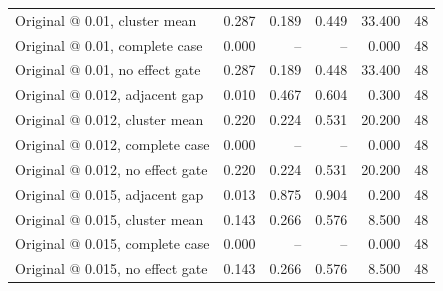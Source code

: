 \begin{table}[htbp]
{\begin{tabular}{lrrrrr}
Original @ 0.01, cluster mean & 0.287 & 0.189 & 0.449 & 33.400 & 48 \\
Original @ 0.01, complete case & 0.000 & -- & -- & 0.000 & 48 \\
Original @ 0.01, no effect gate & 0.287 & 0.189 & 0.448 & 33.400 & 48 \\
Original @ 0.012, adjacent gap & 0.010 & 0.467 & 0.604 & 0.300 & 48 \\
Original @ 0.012, cluster mean & 0.220 & 0.224 & 0.531 & 20.200 & 48 \\
Original @ 0.012, complete case & 0.000 & -- & -- & 0.000 & 48 \\
Original @ 0.012, no effect gate & 0.220 & 0.224 & 0.531 & 20.200 & 48 \\
Original @ 0.015, adjacent gap & 0.013 & 0.875 & 0.904 & 0.200 & 48 \\
Original @ 0.015, cluster mean & 0.143 & 0.266 & 0.576 & 8.500 & 48 \\
Original @ 0.015, complete case & 0.000 & -- & -- & 0.000 & 48 \\
Original @ 0.015, no effect gate & 0.143 & 0.266 & 0.576 & 8.500 & 48 \\
\bottomrule
\end{tabular}%
}
\end{table}
